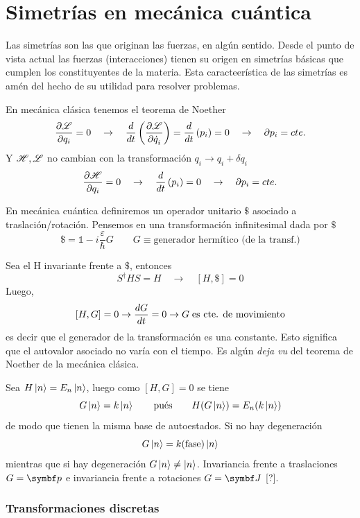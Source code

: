 \documentclass[10pt,oneside]{CBFT_book}
\begin{document}
\chapter{Simetrías en mecánica cuántica}

Las simetrías son las que originan las fuerzas, en algún sentido. Desde el punto de vista actual las
fuerzas (interacciones) tienen su origen en simetrías básicas que cumplen los constituyentes de la
materia.
Esta caracteerística de las simetrías es amén del hecho de su utilidad para resolver problemas.

En mecánica clásica tenemos el teorema de Noether 
\[
	\frac{\partial^{\hspace{-0.05em}} {\mathscr{L}}}{\partial {q_i}^{\hspace{-0.05em}}} = 0 \quad \to \quad \frac{d^{\hspace{-0.05em}} {}}{d {t}^{\hspace{-0.05em}}}\left( \frac{\partial^{\hspace{-0.05em}} {\mathscr{L}}}{\partial {\dot{q}_i}^{\hspace{-0.05em}}} \right) = 
	\frac{d^{\hspace{-0.05em}} {}}{d {t}^{\hspace{-0.05em}}}\left( p_i \right) = 0 \quad \rightarrow \quad \partial p_i = cte.
\]
Y $\mathscr{H}, \mathscr{L}$ no cambian con la transformación $q_i \longrightarrow q_i + \delta q_i$
\[
	\frac{\partial^{\hspace{-0.05em}} {\mathscr{H}}}{\partial {q_i}^{\hspace{-0.05em}}} = 0 \quad \to \quad  
	\frac{d^{\hspace{-0.05em}} {}}{d {t}^{\hspace{-0.05em}}}\left( p_i \right) = 0 \quad \rightarrow \quad \partial p_i = cte. 
\]

En mecánica cuántica definiremos un operador unitario $\$$ asociado a traslación/rotación. 
Pensemos en una transformación infinitesimal dada por $\$$
\[
	\mathbb{\$} = \mathbb{1} - i\frac{\varepsilon}{\hbar}G \qquad G \equiv \text{generador hermítico (de 
la transf.)}
\]

Sea el H invariante frente a $\$$, entonces 
\[
	S^\dagger HS = H \quad  \rightarrow \quad [H,\$] = 0 
\]
Luego,
\[	
	[H,G]=0 \rightarrow \frac{d^{\hspace{-0.05em}} {G}}{d {t}^{\hspace{-0.05em}}} = 0 \rightarrow G \;\text{es cte. de movimiento}
\]
es decir que el generador de la transformación es una constante.
Esto significa que el autovalor asociado no varía con el tiempo. Es algún {\it deja vu} del teorema
de Noether de la mecánica clásica.

Sea $H\Ket{n} = E_n \Ket{n}$, luego como $[H,G]=0$ se tiene 
\[
	G\Ket{n} = k\Ket{n} \qquad \text{pués} \qquad H(G\Ket{n}) = E_n(k\Ket{n})
\]
de modo que tienen la misma base de autoestados. Si no hay degeneración
\[
	G\ket{n} = k(\text{fase}) \Ket{n}
\]
mientras que si hay degeneración $G\Ket{n}\neq \Ket{n}$.
Invariancia frente a traslaciones $G=\vb{p}$ e invariancia frente a rotaciones $G=\vb{J}$ [?].

\subsection{Transformaciones discretas}
\end{document}
